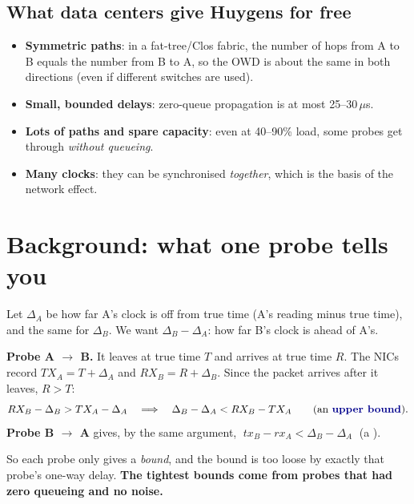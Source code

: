 \subsection{What data centers give Huygens for free}
\begin{itemize}
  \item \textbf{Symmetric paths}: in a fat-tree/Clos fabric, the number of hops from A to B equals the number from B to A, so the OWD is about the
        same in both directions (even if different switches are used).
  \item \textbf{Small, bounded delays}: zero-queue propagation is at most 25--30\,$\mu$s.
  \item \textbf{Lots of paths and spare capacity}: even at 40--90\% load, some probes get through \emph{without queueing}.
  \item \textbf{Many clocks}: they can be synchronised \emph{together}, which is the basis of the network effect.
\end{itemize}

\section{Background: what one probe tells you}


Let $\Delta_A$ be how far A's clock is off from true time (A's reading minus true time), and the same for $\Delta_B$. We want $\Delta_B - \Delta_A$:
how far B's clock is ahead of A's.

\textbf{Probe A $\to$ B.} It leaves at true time $T$ and arrives at true time $R$. The NICs record $TX_A = T + \Delta_A$ and $RX_B = R + \Delta_B$. Since the
packet arrives after it leaves, $R > T$:
\[
RX_B - \Delta_B > TX_A - \Delta_A \quad\Longrightarrow\quad \Delta_B - \Delta_A < RX_B - TX_A \qquad\text{(an \key{upper bound})}.
\]
\textbf{Probe B $\to$ A} gives, by the same argument, $\;tx_B - rx_A < \Delta_B - \Delta_A\;$ (a ).

So each probe only gives a \emph{bound}, and the bound is too loose by exactly that probe's one-way delay. \textbf{The tightest bounds come from probes
that had zero queueing and no noise.}

